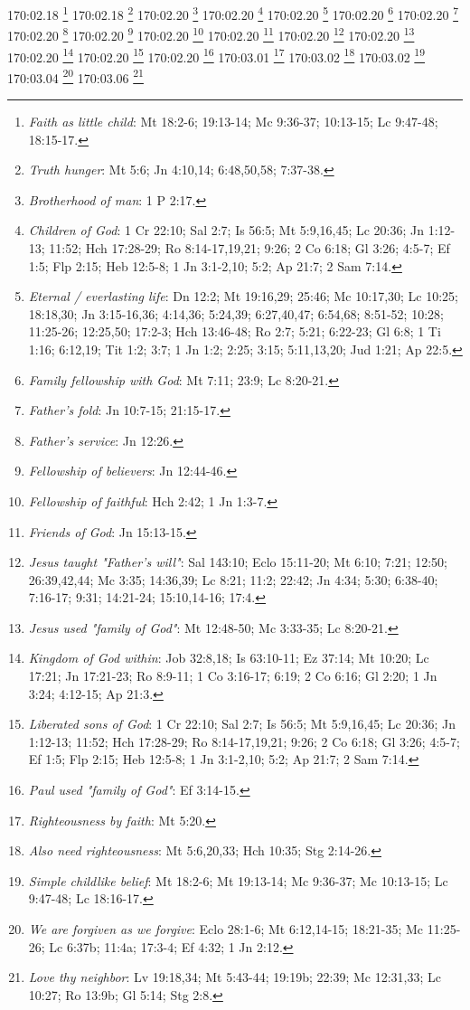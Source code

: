 170:02.18 \footnote{\textit{Faith as little child}: Mt 18:2-6; 19:13-14; Mc 9:36-37; 10:13-15; Lc 9:47-48; 18:15-17.}
170:02.18 \footnote{\textit{Truth hunger}: Mt 5:6; Jn 4:10,14; 6:48,50,58; 7:37-38.}
170:02.20 \footnote{\textit{Brotherhood of man}: 1 P 2:17.}
170:02.20 \footnote{\textit{Children of God}: 1 Cr 22:10; Sal 2:7; Is 56:5; Mt 5:9,16,45; Lc 20:36; Jn 1:12-13; 11:52; Hch 17:28-29; Ro 8:14-17,19,21; 9:26; 2 Co 6:18; Gl 3:26; 4:5-7; Ef 1:5; Flp 2:15; Heb 12:5-8; 1 Jn 3:1-2,10; 5:2; Ap 21:7; 2 Sam 7:14.}
170:02.20 \footnote{\textit{Eternal / everlasting life}: Dn 12:2; Mt 19:16,29; 25:46; Mc 10:17,30; Lc 10:25; 18:18,30; Jn 3:15-16,36; 4:14,36; 5:24,39; 6:27,40,47; 6:54,68; 8:51-52; 10:28; 11:25-26; 12:25,50; 17:2-3; Hch 13:46-48; Ro 2:7; 5:21; 6:22-23; Gl 6:8; 1 Ti 1:16; 6:12,19; Tit 1:2; 3:7; 1 Jn 1:2; 2:25; 3:15; 5:11,13,20; Jud 1:21; Ap 22:5.}
170:02.20 \footnote{\textit{Family fellowship with God}: Mt 7:11; 23:9; Lc 8:20-21.}
170:02.20 \footnote{\textit{Father's fold}: Jn 10:7-15; 21:15-17.}
170:02.20 \footnote{\textit{Father's service}: Jn 12:26.}
170:02.20 \footnote{\textit{Fellowship of believers}: Jn 12:44-46.}
170:02.20 \footnote{\textit{Fellowship of faithful}: Hch 2:42; 1 Jn 1:3-7.}
170:02.20 \footnote{\textit{Friends of God}: Jn 15:13-15.}
170:02.20 \footnote{\textit{Jesus taught "Father's will"}: Sal 143:10; Eclo 15:11-20; Mt 6:10; 7:21; 12:50; 26:39,42,44; Mc 3:35; 14:36,39; Lc 8:21; 11:2; 22:42; Jn 4:34; 5:30; 6:38-40; 7:16-17; 9:31; 14:21-24; 15:10,14-16; 17:4.}
170:02.20 \footnote{\textit{Jesus used "family of God"}: Mt 12:48-50; Mc 3:33-35; Lc 8:20-21.}
170:02.20 \footnote{\textit{Kingdom of God within}: Job 32:8,18; Is 63:10-11; Ez 37:14; Mt 10:20; Lc 17:21; Jn 17:21-23; Ro 8:9-11; 1 Co 3:16-17; 6:19; 2 Co 6:16; Gl 2:20; 1 Jn 3:24; 4:12-15; Ap 21:3.}
170:02.20 \footnote{\textit{Liberated sons of God}: 1 Cr 22:10; Sal 2:7; Is 56:5; Mt 5:9,16,45; Lc 20:36; Jn 1:12-13; 11:52; Hch 17:28-29; Ro 8:14-17,19,21; 9:26; 2 Co 6:18; Gl 3:26; 4:5-7; Ef 1:5; Flp 2:15; Heb 12:5-8; 1 Jn 3:1-2,10; 5:2; Ap 21:7; 2 Sam 7:14.}
170:02.20 \footnote{\textit{Paul used "family of God"}: Ef 3:14-15.}
170:03.01 \footnote{\textit{Righteousness by faith}: Mt 5:20.}
170:03.02 \footnote{\textit{Also need righteousness}: Mt 5:6,20,33; Hch 10:35; Stg 2:14-26.}
170:03.02 \footnote{\textit{Simple childlike belief}: Mt 18:2-6; Mt 19:13-14; Mc 9:36-37; Mc 10:13-15; Lc 9:47-48; Lc 18:16-17.}
170:03.04 \footnote{\textit{We are forgiven as we forgive}: Eclo 28:1-6; Mt 6:12,14-15; 18:21-35; Mc 11:25-26; Lc 6:37b; 11:4a; 17:3-4; Ef 4:32; 1 Jn 2:12.}
170:03.06 \footnote{\textit{Love thy neighbor}: Lv 19:18,34; Mt 5:43-44; 19:19b; 22:39; Mc 12:31,33; Lc 10:27; Ro 13:9b; Gl 5:14; Stg 2:8.}
